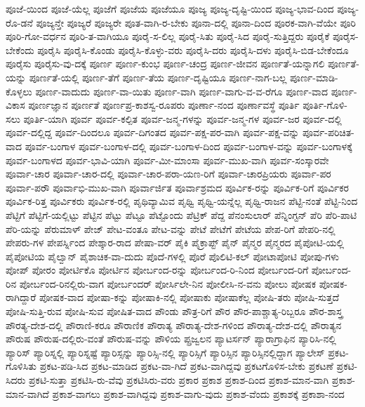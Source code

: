 {ಪೂಜೆ-ಯಿಂದ
ಪೂಜೆ-ಯೆಲ್ಲ
ಪೂಜೆಗೆ
ಪೂಜೆಯ
ಪೂಜೆಯೂ
ಪೂಜ್ಯ
ಪೂಜ್ಯ-ದೃಷ್ಟಿ-ಯಿಂದ
ಪೂಜ್ಯ-ಭಾವ-ದಿಂದ
ಪೂಜ್ಯ-ರೊ-ಡನೆ
ಪೂಜ್ಯನ್ತೇ
ಪೂಜ್ಯರೆ
ಪೂಜ್ಯರೇ
ಪೂತ-ವಾಗಿ-ರ-ಬೇಕು
ಪೂನಾ-ದಲ್ಲಿ
ಪೂನಾ-ದಿಂದ
ಪೂರಕ-ವಾಗಿ-ವೆಯೇ
ಪೂರಿ
ಪೂರಿ-ಗೋ-ವರ್ಧನ
ಪೂರಿ-ತ-ವಾಗಿಯೂ
ಪೂರೈ-ಸ-ಲಿಲ್ಲ
ಪೂರೈ-ಸಿತು
ಪೂರೈ-ಸಿದ
ಪೂರೈ-ಸುತ್ತಿದ್ದರು
ಪೂರೈಕೆ
ಪೂರೈಸ-ಬೇಕೆಂದು
ಪೂರೈಸಿ
ಪೂರೈಸಿ-ಕೊಂಡು
ಪೂರೈಸಿ-ಕೊಳ್ಳು-ವರು
ಪೂರೈಸಿ-ದರು
ಪೂರೈಸಿ-ದಳು
ಪೂರೈಸಿ-ಬಿಡ-ಬೇಕೆಂದೂ
ಪೂರೈಸು
ಪೂರೈಸು-ವು-ದಕ್ಕೆ
ಪೂರ್ಣ
ಪೂರ್ಣ-ಕುಂಭ
ಪೂರ್ಣ-ಚಂದ್ರ
ಪೂರ್ಣ-ಜೀವನ
ಪೂರ್ಣತೆ-ಯನ್ನಾಗಲಿ
ಪೂರ್ಣತೆ-ಯನ್ನು
ಪೂರ್ಣತೆ-ಯಲ್ಲಿ
ಪೂರ್ಣ-ತೆಗೆ
ಪೂರ್ಣ-ತೆಯ
ಪೂರ್ಣ-ದೃಷ್ಟಿಯೂ
ಪೂರ್ಣ-ನಾಗ-ಬಲ್ಲ
ಪೂರ್ಣ-ಮಾಡಿ-ಕೊಳ್ಳಲು
ಪೂರ್ಣ-ವಾದುದು
ಪೂರ್ಣ-ವಾ-ಯಿತು
ಪೂರ್ಣ-ವಾಗಿ
ಪೂರ್ಣ-ವಾಗು-ವ-ವ-ರೆಗೂ
ಪೂರ್ಣ-ವಾದ
ಪೂರ್ಣ-ವಿಕಾಸ
ಪೂರ್ಣಜ್ಞಾನ
ಪೂರ್ಣತೆ
ಪೂರ್ಣಪ್ರ-ಕಾಶಸ್ವ-ರೂಪರು
ಪೂರ್ಣಾ-ನಂದ
ಪೂರ್ಣಾವಸ್ಥೆ
ಪೂರ್ತಿ
ಪೂರ್ತಿ-ಗೊಳಿ-ಸಲು
ಪೂರ್ತಿ-ಯಾಗಿ
ಪೂರ್ವ
ಪೂರ್ವ-ಕಲ್ಪಿತ
ಪೂರ್ವ-ಜನ್ಮ-ಗಳನ್ನು
ಪೂರ್ವ-ಜನ್ಮ-ಗಳ
ಪೂರ್ವ-ಜರ
ಪೂರ್ವ-ದಲ್ಲಿ
ಪೂರ್ವ-ದಲ್ಲಿದ್ದ
ಪೂರ್ವ-ದಿಂದಲೂ
ಪೂರ್ವ-ದಿಗಂತದ
ಪೂರ್ವ-ಪಕ್ಷ-ಪರ-ವಾಗಿ
ಪೂರ್ವ-ಪಕ್ಷ-ವನ್ನು
ಪೂರ್ವ-ಪರಿಚಿತ-ವಾದ
ಪೂರ್ವ-ಬಂಗಾಳ
ಪೂರ್ವ-ಬಂಗಾಳ-ದಲ್ಲಿ
ಪೂರ್ವ-ಬಂಗಾಳ-ದಿಂದ
ಪೂರ್ವ-ಬಂಗಾಳ-ವನ್ನು
ಪೂರ್ವ-ಬಂಗಾಳಕ್ಕೆ
ಪೂರ್ವ-ಬಂಗಾಳದ
ಪೂರ್ವ-ಭಾವಿ-ಯಾಗಿ
ಪೂರ್ವ-ಮೀ-ಮಾಂಸಾ
ಪೂರ್ವ-ಮುಖ-ವಾಗಿ
ಪೂರ್ವ-ಸಂಸ್ಕಾರವೇ
ಪೂರ್ವಾ-ಚಾರ
ಪೂರ್ವಾ-ಚಾರ-ದಲ್ಲಿ
ಪೂರ್ವಾ-ಚಾರ-ಪರಾ-ಯಣ-ರಿಗೆ
ಪೂರ್ವಾ-ಚಾರಪ್ರಿಯರು
ಪೂರ್ವಾ-ಪರ
ಪೂರ್ವಾ-ಪರೌ
ಪೂರ್ವಾಭಿ-ಮುಖ-ವಾಗಿ
ಪೂರ್ವಾರ್ಜಿತ
ಪೂರ್ವಾಶ್ರಮದ
ಪೂರ್ವಿಕ-ರನ್ನು
ಪೂರ್ವಿಕ-ರಿಗೆ
ಪೂರ್ವಿಕರ
ಪೂರ್ವಿಕ-ರಿತ್ತ
ಪೂರ್ವಿಕರು
ಪೂರ್ವಿಕ-ರಲ್ಲಿ
ಪೃಥಿವ್ಯಾಮಿವ
ಪೃಥ್ವಿ
ಪೃಥ್ವಿ-ಯನ್ನೆಲ್ಲ
ಪೃಥ್ವಿ-ರಾಜನ
ಪೆಟ್ಟಿ-ನಂತೆ
ಪೆಟ್ಟಿ-ನಿಂದ
ಪೆಟ್ಟಿಗೆ
ಪೆಟ್ಟಿಗೆ-ಯಲ್ಲಿಟ್ಟು
ಪೆಟ್ಟಿನ
ಪೆಟ್ಟು
ಪೆಟ್ಟೂ
ಪೆಟ್ಟೊಂದು
ಪೆಟ್ರಿಕ್
ಪೆದ್ದ
ಪೆನಂಸುಲಾರ್
ಪೆನ್ನಿಂಗ್ಟನ್
ಪೆರಿ
ಪೆರಿ-ಪಾಟಿ
ಪೆರಿ-ಯನ್ನು
ಪೆರುಮಾಳ್
ಪೇಜ್
ಪೇಟ-ವಂತೂ
ಪೇಟ-ವನ್ನು
ಪೇಟೆ
ಪೇಟೆಗೆ
ಪೇಟೆಯ
ಪೇಪ-ರಿಗೆ
ಪೇಪರಿ-ನಲ್ಲಿ
ಪೇಪರು-ಗಳ
ಪೇಪರ್ಸ್ನಿಂದ
ಪೇಶ್ಕಾರ-ರಾದ
ಪೇಷಾ-ವರ್
ಪೈಕಿ
ಪೈಕ್ರಾಪ್ಟ್
ಪೈನ್
ಪೈನ್ಮರ
ಪೈನ್ಮರದ
ಪೈಪೋಟಿ-ಯಲ್ಲಿ
ಪೈಪೋಟಿಯ
ಪೈಲ್ವಾನ್
ಪೈಶಾಚಿಕ-ವಾ-ದುದು
ಪೊದೆ-ಗಳಲ್ಲಿ
ಪೊರೆ
ಪೊಲಿಟಿ-ಕಲ್
ಪೋಟಾಪೋಟಿ
ಪೋಪು-ಗಳು
ಪೋಪ್
ಪೋರಂ
ಪೋರ್ಟಿಕೊ
ಪೋರ್ಟಿನ
ಪೋರ್ಬಂದ-ರನ್ನು
ಪೋರ್ಬಂದ-ರಿ-ನಿಂದ
ಪೋರ್ಬಂದ-ರಿಗೆ
ಪೋರ್ಬಂದ-ರಿನ
ಪೋರ್ಬಂದ-ರಿನಲ್ಲಿರು-ವಾಗ
ಪೋರ್ಬಂದರ್
ಪೋರ್ಸಿಲೇ-ನಿನ
ಪೋಲೀಸಿ-ನ-ವನು
ಪೋಲು
ಪೋಷಕ
ಪೋಷಕ-ರಾಗಿದ್ದಾರೆ
ಪೋಷಕ-ವಾದ
ಪೋಷಾ-ಕನ್ನು
ಪೋಷಾಕಿ-ನಲ್ಲಿ
ಪೋಷಾಕು
ಪೋಷಾಕೆಲ್ಲ
ಪೋಷಿ-ತರು
ಪೋಷಿ-ಸುತ್ತದೆ
ಪೋಷಿ-ಸುತ್ತಿ-ರುವ
ಪೋಷಿ-ಸುವ
ಪೋಷಿತ-ವಾದ
ಪೌಂಡು
ಪೌತ್ರ-ರಿಗೆ
ಪೌರ
ಪೌರ-ಪಾಶ್ಚಾತ್ಯ-ರಿಬ್ಬರೂ
ಪೌರ-ಶಾಸ್ತ್ರ
ಪೌರತ್ಯ-ದೇಶ-ದಲ್ಲಿ
ಪೌರಾಣಿ-ಕರೂ
ಪೌರಾಣಿಕ
ಪೌರಾತ್ಯ
ಪೌರಾತ್ಯ-ದೇಶ-ಗಳಿಂದ
ಪೌರಾತ್ಯ-ದೇಶ-ದಲ್ಲಿ
ಪೌರಾತ್ಯನ
ಪೌರುಷ
ಪೌರುಷ-ದಲ್ಲಿರು-ವಂತೆ
ಪೌರುಷ-ವನ್ನು
ಪೌಳಿಯ
ಪ್ಪ್ರಜ್ವಲನ
ಪ್ಯಾಟರ್ಸನ್
ಪ್ಯಾರಾಗ್ರಾಫಿನ
ಪ್ಯಾರಿಸಿ-ನಲ್ಲಿ
ಪ್ಯಾರಿಸ್
ಪ್ಯಾರಿಸ್ನಲ್ಲಿ
ಪ್ಯಾರಿಸ್ನಷ್ಟೆ
ಪ್ಯಾರಿಸ್ಸನ್ನು
ಪ್ಯಾರಿಸ್ಸಿ-ನಲ್ಲಿ
ಪ್ಯಾರಿಸ್ಸಿಗೆ
ಪ್ಯಾರಿಸ್ಸಿನ
ಪ್ಯಾರಿಸ್ಸಿನಲ್ಲಿದ್ದಾಗ
ಪ್ಯಾಲೇಸ್
ಪ್ರಕಟ-ಗೊಳಿಸಿತು
ಪ್ರಕಟ-ಪಡಿ-ಸಿದ
ಪ್ರಕಟ-ಮಾಡಿದ
ಪ್ರಕಟ-ವಾ-ಗಿದೆ
ಪ್ರಕಟ-ವಾಗಿದ್ದವು
ಪ್ರಕಟಗೊಳಿಸ-ಬೇಕು
ಪ್ರಕಟಣೆ
ಪ್ರಕಟಿ-ಸಿದರು
ಪ್ರಕಟಿ-ಸುತ್ತಾ
ಪ್ರಕಟಿಸಿ-ರು-ವೆವು
ಪ್ರಕಟಿಸಿರು-ವರು
ಪ್ರಕಾರ
ಪ್ರಕಾಶ
ಪ್ರಕಾಶ-ದಿಂದ
ಪ್ರಕಾಶ-ಮಾನ-ವಾಗಿ
ಪ್ರಕಾಶ-ಮಾನ-ವಾಗಿದೆ
ಪ್ರಕಾಶ-ವಾಗಲು
ಪ್ರಕಾಶ-ವಾಗಿದ್ದವು
ಪ್ರಕಾಶ-ವಾಗು-ವುದು
ಪ್ರಕಾಶ-ವೆಂದು
ಪ್ರಕಾಶಕ್ಕೆ
ಪ್ರಕಾಶಾ-ನಂದ
}
